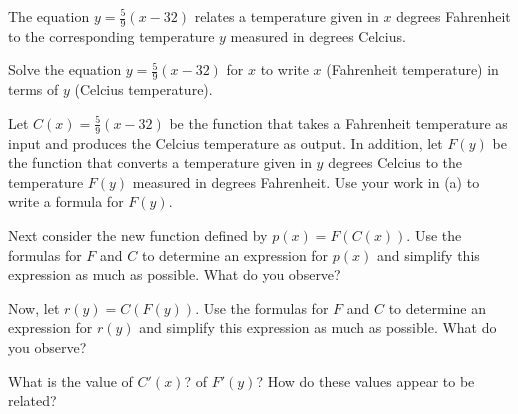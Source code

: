 \begin{pa} \label{PA:2.6}
The equation $y = \frac{5}{9}(x-32)$ relates a temperature given in $x$ degrees Fahrenheit to the corresponding temperature $y$ measured in degrees Celcius.  
\ba
	\item Solve the equation $y = \frac{5}{9}(x-32)$ for $x$ to write $x$ (Fahrenheit temperature) in terms of $y$ (Celcius temperature).
	\item Let $C(x) = \frac{5}{9}(x-32)$ be the function that takes a Fahrenheit temperature as input and produces the Celcius temperature as output.  In addition,  let $F(y)$ be the function that converts a temperature given in $y$ degrees Celcius to the temperature $F(y)$ measured in degrees Fahrenheit.  Use your work in (a) to write a formula for $F(y)$.
	\item Next consider the new function defined by $p(x) = F(C(x))$.  Use the formulas for $F$ and $C$ to determine an expression for $p(x)$ and simplify this expression as much as possible.  What do you observe?
	\item Now, let $r(y) = C(F(y))$.  Use the formulas for $F$ and $C$ to determine an expression for $r(y)$ and simplify this expression as much as possible.  What do you observe?
	\item What is the value of $C'(x)$?  of $F'(y)$?  How do these values appear to be related?
\ea
\end{pa} 
\afterpa